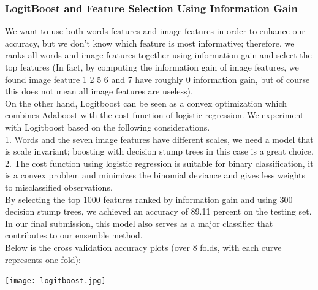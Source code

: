 \subsubsection{LogitBoost and Feature Selection Using Information Gain}
\label{logitboostFSIG}
 We want to use both words features and image features in order to enhance our accuracy, but we don't know which feature is most informative; therefore, we ranks all words and image features together using information gain and select the top features (In fact, by computing the information gain of image features, we found image feature 1 2 5 6 and 7 have roughly 0 information gain, but of course this does not mean all image features are useless).\\
On the other hand, Logitboost can be seen as a convex optimization which combines Adaboost with the cost function of logistic regression. We experiment with Logitboost based on the following considerations.\\
1. Words and the seven image features have different scales, we need a model that is scale invariant; boosting with decision stump trees in this case is a great choice.\\
2. The cost function using logistic regression is suitable for binary classification, it is a convex problem and minimizes the binomial deviance and gives less weights to misclassified observations.\\
By selecting the top 1000 features ranked by information gain and using 300 decision stump trees, we achieved an accuracy of 89.11 percent on the testing set.\\
In our final submission, this model also serves as a major classifier that contributes to our ensemble method.\\
Below is the cross validation accuracy plots (over 8 folds, with each curve represents one fold):\\
\begin{center}
\texttt{[image: logitboost.jpg]}
\end{center}
